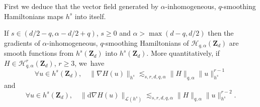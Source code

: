 First we deduce that the vector field generated by $\alpha$-inhomogeneous, $q$-smoothing Hamiltonians maps $h^s$ into itself.
\begin{proposition}
\label{prop_vf}
If $s\in (d/2-q, \alpha-d/2+q)$, $s\geq 0$ and $\alpha >\max(d-q,d/2)$ then the gradients of $\alpha$-inhomogeneous, $q$-smoothing Hamiltonians of $ \mathscr{H}_{q,\alpha}(\mathbf{Z}_d)$ are smooth functions from $h^s(\mathbf{Z}_d)$ into $h^s(\mathbf{Z}_d)$. More quantitatively, if $H\in \mathscr{H}_{q,\alpha}^r(\mathbf{Z}_d)$, $r\geq 3$, we~have
\begin{equation}
\label{eq_cont_X}
\forall u \in h^s(\mathbf{Z}_d), \quad \|\nabla H(u)\|_{h^s} \lesssim_{s,r,d,q,\alpha} \| H \|_{q,\alpha} \|u\|_{h^s}^{r-1}
\end{equation}
and
\begin{equation}
\label{eq_cont_dX}
\forall u \in h^s(\mathbf{Z}_d), \quad \| \mathrm{d} \nabla H(u)\|_{\mathscr{L}(h^s)} \lesssim_{s,r,d,q,\alpha} \| H \|_{q,\alpha} \|u\|_{h^s}^{r-2}.
\end{equation}
\end{proposition}
